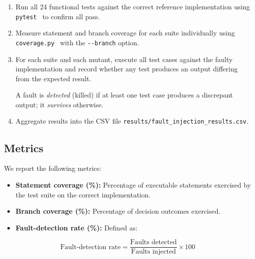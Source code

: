 \documentclass[conference]{IEEEtran}
\begin{document}
\begin{enumerate}

\item Run all 24 functional tests against the correct reference implementation using \texttt{pytest}~\cite{pytest2026} to confirm all pass.

\item Measure statement and branch coverage for each suite individually using \texttt{coverage.py}~\cite{coverage2026} with the \texttt{-{}-branch} option.

\item For each suite and each mutant, execute all test cases against the faulty implementation and record whether any test produces an output differing from the expected result.

A fault is \emph{detected} (killed) if at least one test case produces a discrepant output; it \emph{survives} otherwise.

\item Aggregate results into the CSV file \texttt{results/fault\_injection\_results.csv}.

\end{enumerate}



\subsection{Metrics}

\label{sec:metrics}

We report the following metrics:



\begin{itemize}

\item \textbf{Statement coverage (\%):} Percentage of executable statements exercised by the test suite on the correct implementation.

\item \textbf{Branch coverage (\%):} Percentage of decision outcomes exercised.

\item \textbf{Fault-detection rate (\%):} Defined as:

\end{itemize}



\begin{equation}
\text{Fault-detection rate} = \frac{\text{Faults detected}}{\text{Faults injected}} \times 100
\label{eq:fdr}
\end{equation}
\end{document}
